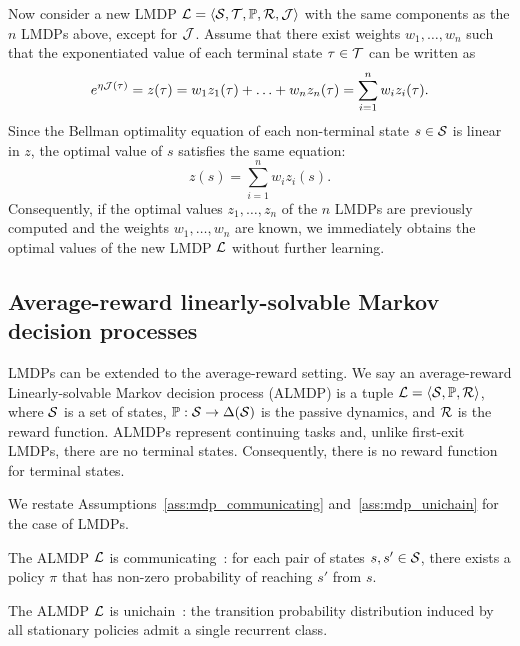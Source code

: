 Now consider a new LMDP $\mathcal{L}=\langle\mathcal{S},\mathcal{T},\mathbb{P},\mathcal{R},\mathcal{J}\rangle$ with the same components as the $n$ LMDPs above, except for $\mathcal{J}$. Assume that there exist weights $w_1,\ldots,w_n$ such that the exponentiated value of each terminal state $\tau\in\mathcal{T}$ can be written as
\begin{equation*}
  e^{\eta \mathcal{J}(\tau)} = z(\tau) = w_1z_1(\tau) + \ldots + w_nz_n(\tau) = \sum_{i=1}^n w_i z_i(\tau).
\end{equation*}
Since the Bellman optimality equation of each non-terminal state $s\in\mathcal{S}$ is linear in $z$, the optimal value of $s$ satisfies the same equation:
\begin{equation*}
  z(s) = \sum_{i=1}^n w_i z_i(s).
\end{equation*}
Consequently, if the optimal values $z_1,\ldots,z_n$ of the $n$ LMDPs are previously computed and the weights $w_1,\ldots,w_n$ are known, we immediately obtains the optimal values of the new LMDP $\mathcal{L}$ without further learning.


\subsection{Average-reward linearly-solvable Markov decision processes}

LMDPs can be extended to the average-reward setting. We say an average-reward Linearly-solvable Markov decision process (ALMDP) is a tuple
$\mathcal{L} = \langle\mathcal{S},\mathbb{P},\mathcal{R}\rangle$, where $\mathcal{S}$ is a set of states, $\mathbb{P}:\mathcal{S}\rightarrow\Delta(\mathcal{S})$ is the passive dynamics, and $\mathcal{R}$ is the reward function. ALMDPs represent continuing tasks and, unlike first-exit LMDPs, there are no terminal states. Consequently, there is no reward function for terminal states.  

We restate Assumptions~\ref{ass:mdp_communicating} and~\ref{ass:mdp_unichain} for the case of LMDPs.

\begin{assumption}
  The ALMDP $\mathcal{L}$ is communicating~\citep{Puterman1994}: for each pair of states $s,s'\in\mathcal{S}$, there exists a policy $\pi$ that has non-zero probability of reaching $s'$ from $s$.
  \label{ass:communicating}
\end{assumption}

\begin{assumption}
  The ALMDP $\mathcal{L}$ is unichain~\citep{Puterman1994}: the transition probability distribution induced by all stationary policies admit a single recurrent class.
  \label{ass:unichain}
\end{assumption}

